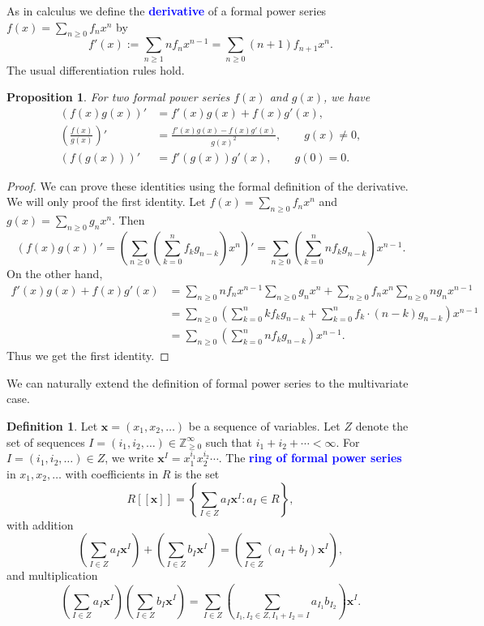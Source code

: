 \documentclass[oneside]{book}
\numberwithin{equation}{section}
\newtheorem{prop}[thm]{Proposition}
\theoremstyle{definition}
\newtheorem{defn}[thm]{Definition}
\newcommand{\ZZ}{\mathbb{Z}}
\renewcommand\vec[1]{\mathbf{#1}}
\newcommand\vx{\vec{x}}
\renewcommand\emph[1]{\textcolor{blue}{\bf #1}}
\begin{document}
As in calculus we define the \emph{derivative} of a formal power
series \( f(x) = \sum_{n\ge0} f_n x^n \) by
\[
  f'(x) := \sum_{n\ge1} n f_n x^{n-1} = \sum_{n\ge0} (n+1) f_{n+1} x^{n}.
\]
The usual differentiation rules hold.
\begin{prop}
  For two formal power series \( f(x) \) and \( g(x) \),
  we have
\begin{align*}
  (f(x)g(x))'
  &= f'(x) g(x) + f(x) g'(x), \\
  \left(\frac{f(x)}{g(x)}\right)'
  &= \frac{f'(x) g(x) - f(x) g'(x)}{g(x)^2}, \qquad g(x) \ne 0,\\
  (f(g(x)))'
  &= f'(g(x)) g'(x), \qquad g(0) = 0.
\end{align*}
\end{prop}

\begin{proof}
  We can prove these identities using the formal definition of the
  derivative. We will only proof the first identity. Let
  \( f(x) = \sum_{n\ge0} f_n x^n \) and
  \( g(x) = \sum_{n\ge0} g_n x^n \). Then
  \[
    (f(x)g(x))' = \left( \sum_{n\ge 0} \left( \sum_{k=0}^{n} f_kg_{n-k} \right) x^{n} \right)'
      = \sum_{n\ge 0} \left( \sum_{k=0}^{n} n f_kg_{n-k}
    \right) x^{n-1}.
  \]
  On the other hand,
  \begin{align*}
    f'(x) g(x) + f(x) g'(x)
    & =  \sum_{n\ge0} n f_n x^{n-1} \sum_{n\ge0} g_n x^n +   
      \sum_{n\ge0} f_n x^n \sum_{n\ge0} n g_n x^{n-1}\\
    &= \sum_{n\ge 0} \left( \sum_{k=0}^{n} kf_kg_{n-k}
      + \sum_{k=0}^{n} f_k\cdot (n-k)g_{n-k} \right) x^{n-1}\\
    &= \sum_{n\ge 0} \left( \sum_{k=0}^{n} nf_kg_{n-k} \right) x^{n-1}.
  \end{align*}
  Thus we get the first identity.
\end{proof}





We can naturally extend the definition of formal power series to the
multivariate case.


\begin{defn}
  Let \( \vx =(x_1,x_2,\dots) \) be a sequence of variables. Let
  \( Z \) denote the set of sequences
  \( I=(i_1,i_2,\dots)\in \ZZ_{\ge0}^\infty \) such that
  \( i_1+i_2 + \cdots < \infty \). For \( I=(i_1,i_2,\dots)\in Z \),
  we write \( \vx^I = x_1^{i_1} x_2^{i_2} \cdots \). The \emph{ring of
    formal power series} in \( x_1,x_2,\dots \) with coefficients in
  \( R \) is the set
\[
  R[[\vx]] = \left\{ \sum_{I\in Z} a_I \vx^I  : a_I\in R \right\},
\]
with addition
\[
  \left(\sum_{I\in Z} a_I \vx^I \right) + \left(\sum_{I\in Z} b_I \vx^I
  \right) = \left( \sum_{I\in Z} (a_I+b_I) \vx^I \right),
\]
and multiplication
\[
  \left(\sum_{I\in Z} a_I \vx^I \right) \left(\sum_{I\in Z} b_I \vx^I
  \right) = \sum_{I\in Z} \left( \sum_{I_1,I_2\in Z, I_1+I_2=I} a_{I_1} b_{I_2} \right) \vx^I.
\]
\end{defn}
\end{document}
